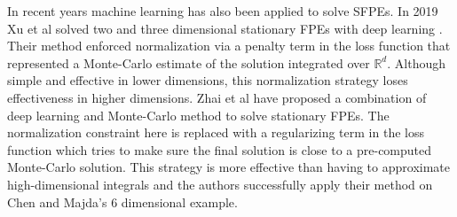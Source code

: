 In recent years machine learning has also been applied to solve SFPEs. In 2019 Xu et al solved two and three dimensional stationary FPEs with deep learning \cite{xu2020solving}. Their method enforced normalization via a penalty term in the loss function that represented a Monte-Carlo estimate of the solution integrated over $\mathbb R^d$. Although simple and effective in lower dimensions, this normalization strategy loses effectiveness in higher dimensions. Zhai et al \cite{zhai2022deep} have proposed a combination of deep learning and Monte-Carlo method to solve stationary FPEs. The normalization constraint here is replaced with a regularizing term in the loss function which tries to make sure the final solution is close to a pre-computed Monte-Carlo solution. This strategy is more effective than having to approximate high-dimensional integrals and the authors successfully apply their method on Chen and Majda's 6 dimensional example.






